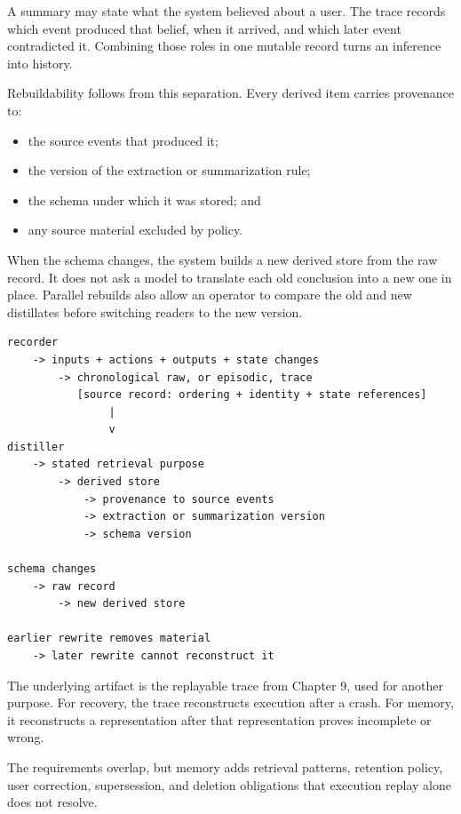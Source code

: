 A summary may state what the system believed about a user. The trace records which event produced that belief, when it arrived, and which later event contradicted it. Combining those roles in one mutable record turns an inference into history.


Rebuildability follows from this separation. Every derived item carries provenance to:

\begin{itemize}
\tightlist
\item
  the source events that produced it;
\item
  the version of the extraction or summarization rule;
\item
  the schema under which it was stored; and
\item
  any source material excluded by policy.
\end{itemize}

When the schema changes, the system builds a new derived store from the raw record. It does not ask a model to translate each old conclusion into a new one in place. Parallel rebuilds also allow an operator to compare the old and new distillates before switching readers to the new version.

\begin{verbatim}
recorder
    -> inputs + actions + outputs + state changes
        -> chronological raw, or episodic, trace
           [source record: ordering + identity + state references]
                |
                v
distiller
    -> stated retrieval purpose
        -> derived store
            -> provenance to source events
            -> extraction or summarization version
            -> schema version

schema changes
    -> raw record
        -> new derived store

earlier rewrite removes material
    -> later rewrite cannot reconstruct it
\end{verbatim}

The underlying artifact is the replayable trace from Chapter 9, used for another purpose. For recovery, the trace reconstructs execution after a crash. For memory, it reconstructs a representation after that representation proves incomplete or wrong.

The requirements overlap, but memory adds retrieval patterns, retention policy, user correction, supersession, and deletion obligations that execution replay alone does not resolve.

